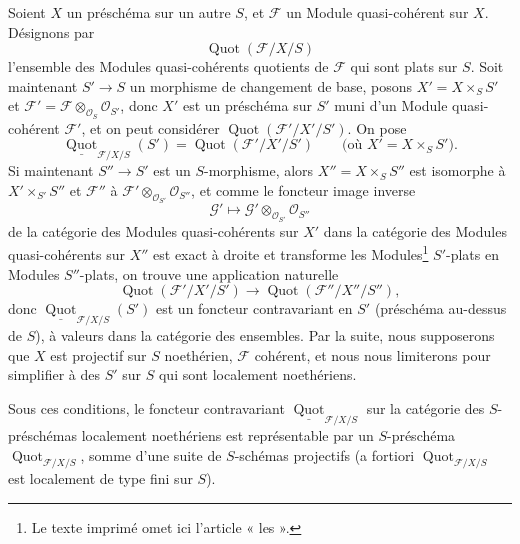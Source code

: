 Soient $X$ un préschéma sur un autre $S$, et $\mathcal F$ un Module
quasi-cohérent sur $X$. Désignons par
\[
\operatorname{Quot}(\mathcal F/X/S)
\]
l'ensemble des Modules quasi-cohérents quotients de $\mathcal F$ qui sont plats
sur $S$. Soit maintenant $S'\longrightarrow S$ un morphisme de changement de
base, posons $X'=X\times_S S'$ et
$\mathcal F'=\mathcal F\otimes_{\mathcal O_S}\mathcal O_{S'}$, donc $X'$ est
un préschéma sur $S'$ muni d'un Module
quasi-cohérent $\mathcal F'$, et on peut considérer
$\operatorname{Quot}(\mathcal F'/X'/S')$. On pose
\[
\underline{\operatorname{Quot}}_{\mathcal F/X/S}(S')
=\operatorname{Quot}(\mathcal F'/X'/S')
\qquad\text{(où $X'=X\times_SS'$)}.
\]
Si maintenant $S''\longrightarrow S'$ est un $S$-morphisme, alors
$X''=X\times_SS''$ est isomorphe à $X'\times_{S'}S''$ et $\mathcal F''$ à
$\mathcal F'\otimes_{\mathcal O_{S'}}\mathcal O_{S''}$, et comme le foncteur
image inverse
\[
\mathcal G'\longmapsto
\mathcal G'\otimes_{\mathcal O_{S'}}\mathcal O_{S''}
\]
de la catégorie des Modules quasi-cohérents sur $X'$ dans la catégorie des
Modules quasi-cohérents sur $X''$ est exact à droite et transforme les Modules\footnote{Le texte imprimé omet ici l'article « les ».}
$S'$-plats en Modules $S''$-plats, on trouve une application naturelle
\[
\operatorname{Quot}(\mathcal F'/X'/S')\longrightarrow
\operatorname{Quot}(\mathcal F''/X''/S''),
\]
donc $\underline{\operatorname{Quot}}_{\mathcal F/X/S}(S')$ est un foncteur
contravariant en $S'$ (préschéma au-dessus de $S$), à valeurs dans la catégorie
des ensembles. Par la suite, nous supposerons que $X$ est projectif sur $S$
noethérien, $\mathcal F$ cohérent, et nous nous limiterons pour simplifier à
des $S'$ sur $S$ qui sont localement noethériens.

 Sous ces conditions, le foncteur contravariant
$\underline{\operatorname{Quot}}_{\mathcal F/X/S}$ sur la catégorie des
$S$-préschémas localement noethériens est représentable par un $S$-préschéma
$\operatorname{Quot}_{\mathcal F/X/S}$, somme d'une suite de $S$-schémas
projectifs (a fortiori $\operatorname{Quot}_{\mathcal F/X/S}$ est localement de
type fini sur $S$).


